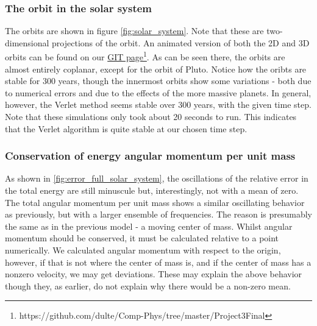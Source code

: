 \documentclass[a4paper, 10pt]{article}
\begin{document}
\subsubsection{The orbit in the solar system}
The orbits are shown in figure \cref{fig:solar_system}. Note that these are two-dimensional projections of the orbit. An animated version of both the 2D and 3D orbits can be found on our \href{https://github.com/dulte/Comp-Phys/tree/master/Project3Final}{GIT page}\footnote{https://github.com/dulte/Comp-Phys/tree/master/Project3Final}. As can be seen there, the orbits are almost entirely coplanar, except for the orbit of Pluto. Notice how the oribts are stable for 300 years, though the innermost orbits show some variations - both due to numerical errors and due to the effects of the more massive planets. In general, however, the Verlet method seems stable over 300 years, with the given time step. Note that these simulations only took about 20 seconds to run. This indicates that the Verlet algorithm is quite stable at our chosen time step.
\subsubsection{Conservation of energy angular momentum per unit mass}
As shown in \cref{fig:error_full_solar_system}, the oscillations of the relative error in the total energy are still minuscule but, interestingly, not with a mean of zero. The total angular momentum per unit mass shows a similar oscillating behavior as previously, but with a larger ensemble of frequencies. The reason is presumably the same as in the previous model - a moving center of mass. Whilst angular momentum should be conserved, it must be calculated relative to a point numerically. We calculated angular momentum with respect to the origin, however, if that is not where the center of mass is, and if the center of mass has a nonzero velocity, we may get deviations. These may explain the above behavior though they, as earlier, do not explain why there would be a non-zero mean.
\end{document}
